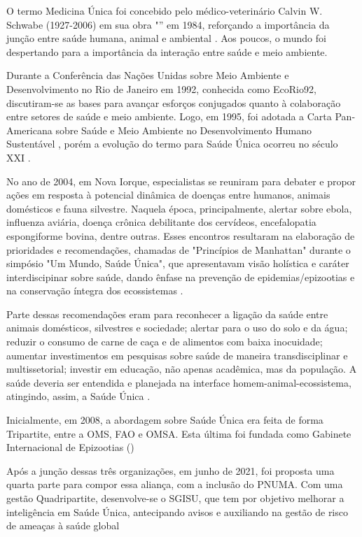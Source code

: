 \indent O termo Medicina Única foi concebido pelo médico-veterinário Calvin W. Schwabe (1927-2006) em sua obra "” em 1984, reforçando a importância da junção entre saúde humana, animal e ambiental \cite{CFMVSaude}. Aos poucos, o mundo foi despertando para a importância da interação entre saúde e meio ambiente.

\indent Durante a Conferência das Nações Unidas sobre Meio Ambiente e Desenvolvimento no Rio de Janeiro em 1992, conhecida como EcoRio92, discutiram-se as bases para avançar esforços conjugados quanto à colaboração entre setores de saúde e meio ambiente. Logo, em 1995, foi adotada a Carta Pan-Americana sobre Saúde e Meio Ambiente no Desenvolvimento Humano Sustentável \cite{S1_OPAS_OMS}, porém a evolução do termo para Saúde Única ocorreu no século XXI \cite{CFMVSaude}. 

\indent No ano de 2004, em Nova Iorque, especialistas se reuniram para debater e propor ações em resposta à potencial dinâmica de doenças entre humanos, animais domésticos e fauna silvestre. Naquela época, principalmente, alertar sobre ebola, influenza aviária, doença crônica debilitante dos cervídeos, encefalopatia espongiforme bovina, dentre outras. Esses encontros resultaram na elaboração de prioridades e recomendações, chamadas de "Princípios de Manhattan" durante o simpósio "Um Mundo, Saúde Única", que apresentavam visão holística e caráter interdiscipinar sobre saúde, dando ênfase na prevenção de epidemias/epizootias e na conservação íntegra dos ecossistemas \cite{ManhattanPrinciples2004}.

\indent Parte dessas recomendações eram para reconhecer a ligação da saúde entre animais domésticos, silvestres e sociedade; alertar para o uso do solo e da água; reduzir o consumo de carne de caça e de alimentos com baixa inocuidade; aumentar investimentos em pesquisas sobre saúde de maneira transdisciplinar e multissetorial; investir em educação, não apenas acadêmica, mas da população. A saúde deveria ser entendida e planejada na interface homem-animal-ecossistema, atingindo, assim, a Saúde Única \cite{ManhattanPrinciples2004}.

\indent Inicialmente, em 2008, a abordagem sobre Saúde Única era feita de forma Tripartite, entre a \acrfull{OMS}, \acrfull{FAO} e \acrfull{OMSA}. Esta última foi fundada como Gabinete Internacional de Epizootias () %

\indent Após a junção dessas três organizações, em junho de 2021, foi proposta uma quarta parte para compor essa aliança, com a inclusão do \acrfull{PNUMA}. Com uma gestão Quadripartite, desenvolve-se o \acrfull{SGISU}, que tem por objetivo melhorar a inteligência em Saúde Única, antecipando avisos e auxiliando na gestão de risco de ameaças à saúde global %

